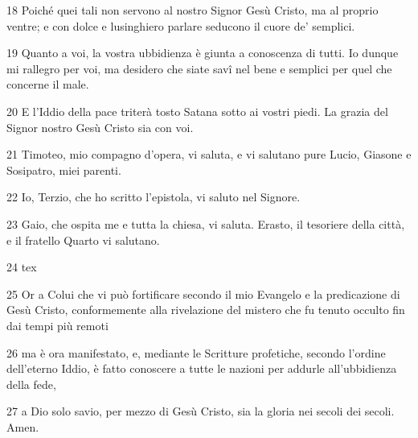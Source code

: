 \par 18 Poiché quei tali non servono al nostro Signor Gesù Cristo, ma al proprio ventre; e con dolce e lusinghiero parlare seducono il cuore de' semplici.
\par 19 Quanto a voi, la vostra ubbidienza è giunta a conoscenza di tutti. Io dunque mi rallegro per voi, ma desidero che siate savî nel bene e semplici per quel che concerne il male.
\par 20 E l'Iddio della pace triterà tosto Satana sotto ai vostri piedi. La grazia del Signor nostro Gesù Cristo sia con voi.
\par 21 Timoteo, mio compagno d'opera, vi saluta, e vi salutano pure Lucio, Giasone e Sosipatro, miei parenti.
\par 22 Io, Terzio, che ho scritto l'epistola, vi saluto nel Signore.
\par 23 Gaio, che ospita me e tutta la chiesa, vi saluta. Erasto, il tesoriere della città, e il fratello Quarto vi salutano.
\par 24 tex
\par 25 Or a Colui che vi può fortificare secondo il mio Evangelo e la predicazione di Gesù Cristo, conformemente alla rivelazione del mistero che fu tenuto occulto fin dai tempi più remoti
\par 26 ma è ora manifestato, e, mediante le Scritture profetiche, secondo l'ordine dell'eterno Iddio, è fatto conoscere a tutte le nazioni per addurle all'ubbidienza della fede,
\par 27 a Dio solo savio, per mezzo di Gesù Cristo, sia la gloria nei secoli dei secoli. Amen.


